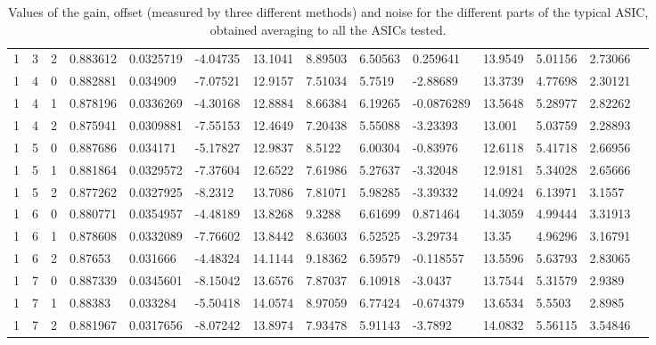 \documentclass[main.tex]{subfiles}
\begin{document}
\begin{table}
{\begin{tabular}{llllllllllllll}
      1 & 3 & 2 &   0.883612 & 0.0325719 & -4.04735 & 13.1041 & 8.89503 & 6.50563 & 0.259641 & 13.9549 & 5.01156 & 2.73066 \\
      1 & 4 & 0 &   0.882881 & 0.034909 & -7.07521 & 12.9157 & 7.51034 & 5.7519 & -2.88689 & 13.3739 & 4.77698 & 2.30121 \\
      1 & 4 & 1 &   0.878196 & 0.0336269 & -4.30168 & 12.8884 & 8.66384 & 6.19265 & -0.0876289 & 13.5648 & 5.28977 & 2.82262 \\
      1 & 4 & 2 &   0.875941 & 0.0309881 & -7.55153 & 12.4649 & 7.20438 & 5.55088 & -3.23393 & 13.001 & 5.03759 & 2.28893 \\
      1 & 5 & 0 &   0.887686 & 0.034171 & -5.17827 & 12.9837 & 8.5122 & 6.00304 & -0.83976 & 12.6118 & 5.41718 & 2.66956 \\
      1 & 5 & 1 &   0.881864 & 0.0329572 & -7.37604 & 12.6522 & 7.61986 & 5.27637 & -3.32048 & 12.9181 & 5.34028 & 2.65666 \\
      1 & 5 & 2 &   0.877262 & 0.0327925 & -8.2312 & 13.7086 & 7.81071 & 5.98285 & -3.39332 & 14.0924 & 6.13971 & 3.1557 \\
      1 & 6 & 0 &   0.880771 & 0.0354957 & -4.48189 & 13.8268 & 9.3288 & 6.61699 & 0.871464 & 14.3059 & 4.99444 & 3.31913 \\
      1 & 6 & 1 &   0.878608 & 0.0332089 & -7.76602 & 13.8442 & 8.63603 & 6.52525 & -3.29734 & 13.35 & 4.96296 & 3.16791 \\
      1 & 6 & 2 &   0.87653 & 0.031666 & -4.48324 & 14.1144 & 9.18362 & 6.59579 & -0.118557 & 13.5596 & 5.63793 & 2.83065 \\
      1 & 7 & 0 &   0.887339 & 0.0345601 & -8.15042 & 13.6576 & 7.87037 & 6.10918 & -3.0437 & 13.7544 & 5.31579 & 2.9389 \\
      1 & 7 & 1 &   0.88383 & 0.033284 & -5.50418 & 14.0574 & 8.97059 & 6.77424 & -0.674379 & 13.6534 & 5.5503 & 2.8985 \\
      1 & 7 & 2 &   0.881967 & 0.0317656 & -8.07242 & 13.8974 & 7.93478 & 5.91143 & -3.7892 & 14.0832 & 5.56115 & 3.54846 \\
      \hline

  \end{tabular}}
  \caption{Values of the gain, offset (measured by three different methods) and noise for the different parts of the typical ASIC, obtained averaging to all the ASICs tested.}
  \label{tab:allasicsdata}
\end{table}
\end{document}

